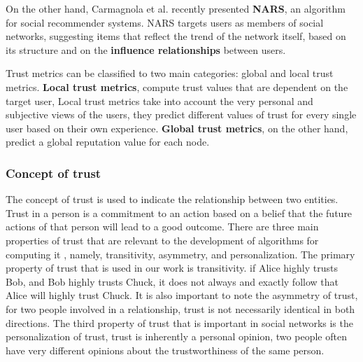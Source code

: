 On the other hand,
	Carmagnola et al. \cite{carmagnola_sonars_2009} recently presented \textbf{NARS},
	an algorithm for social recommender systems.
NARS targets users as members of social networks,
	suggesting items that reflect the trend of the network itself,
	based on its structure and on the \textbf{influence relationships} between users.


Trust metrics can be classified to two main categories: global and local trust metrics.
\textbf{Local trust metrics},
	compute trust values that are dependent on the target user,
	Local trust metrics take into account the very personal and subjective views of the users,
	they predict different values of trust for every single user based on their own experience.
\textbf{Global trust metrics},
	on the other hand,
	predict a global reputation value for each node.

\subsubsection{Concept of trust}

The concept of trust is used to indicate the relationship between two entities.
Trust in a person is a commitment to an action based on a belief that the future actions of that person will lead to a good outcome.
There are three main properties of trust that are relevant to the development of algorithms for computing it \cite{wang_trustinvolved_2010},
	namely,
	transitivity,
	asymmetry,
	and personalization.
The primary property of trust that is used in our work is transitivity.
	if Alice highly trusts Bob,
	and Bob highly trusts Chuck,
	it does not always and exactly follow that Alice will highly trust Chuck.
It is also important to note the asymmetry of trust,
	for two people involved in a relationship,
	trust is not necessarily identical in both directions.
The third property of trust that is important in social networks is the personalization of trust,
	trust is inherently a personal opinion,
	two people often have very different opinions about the trustworthiness of the same person.

